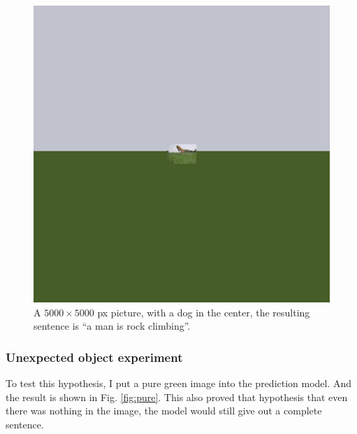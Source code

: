 \documentclass[10pt,twocolumn,letterpaper]{article}
\begin{document}
\begin{figure}[t]
    \begin{center}
        \includegraphics[width=0.9\linewidth]{2584487952_f70e5aa9bf.jpg}
    \end{center}
    \caption{A $5000 \times 5000$ px picture, with a dog in the center, the resulting sentence is ``a man is rock climbing''.}
    \label{fig:hs}
\end{figure}

\subsubsection{Unexpected object experiment} \label{sec:uo}
To test this hypothesis, I put a pure green image into the prediction model.
And the result is shown in Fig. \ref{fig:pure}.
This also proved that hypothesis that even there was nothing in the image, the model would still give out a complete sentence.
\end{document}

